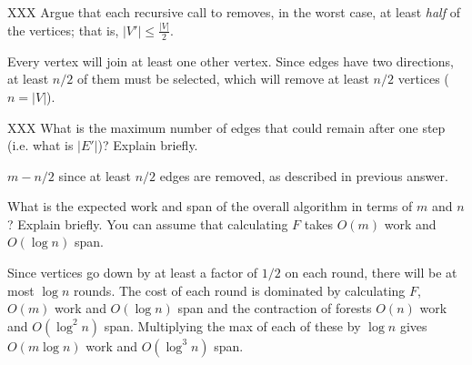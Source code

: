 \begin{problem}[4.]
XXX
\ask
Argue that each recursive call to  removes, in the worst
case, at least \emph{half} of the vertices; that is, $|V'| \leq \frac{|V|}{2}$.

\sol
Every vertex will join at least one other vertex. Since edges have
two directions, at least $n/2$ of them must be selected, which will remove
at least $n/2$ vertices ($n = |V|$).
\end{problem}

\begin{problem}[4.]
XXX
\ask
What is the maximum number of edges that could remain after one step
(i.e. what is $|E'|$)? Explain briefly.

\sol
$m - n/2$ since at least $n/2$ edges are removed, as described in
previous answer.
\end{problem}

\begin{problem}[5.]
What is the expected work and span of the overall algorithm in terms of
$m$ and $n$? Explain briefly. You can assume that calculating $F$ takes
$O(m)$ work and $O(\log n)$ span.

\sol
Since vertices go down by at least a factor of $1/2$ on each round,
there will be at most $\log n$ rounds.  The cost of each round is
dominated by calculating $F$, $O(m)$ work and $O(\log n)$ span and the
contraction of forests $O(n)$ work and $O(\log^2 n)$ span.
Multiplying the max of each of these by $\log n$ gives $O(m \log n)$ work
and $O(\log^3 n)$ span.
\end{problem}

